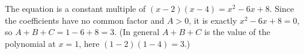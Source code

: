 The equation is a constant multiple of $(x-2)(x-4)=x^2-6x+8$. Since the coefficients have no common factor and $A>0$, it is exactly $x^2-6x+8=0$, so $A+B+C=1-6+8=\boxed{3}$. (In general $A+B+C$ is the value of the polynomial at $x=1$, here $(1-2)(1-4)=3$.)
